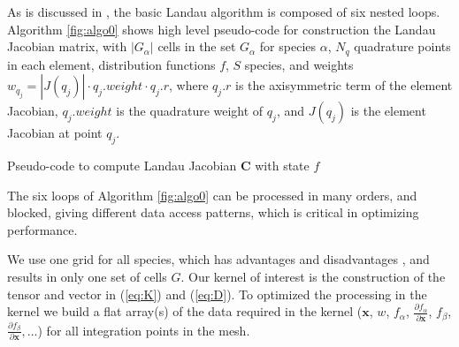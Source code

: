 \documentclass[12pt]{siamart}
\begin{document}
As is discussed in \cite{AdamsHirvijokiKnepleyBrownIsaacMills2017}, the basic Landau algorithm is composed of six nested loops.
Algorithm \ref{fig:algo0} shows high level pseudo-code for construction the
Landau Jacobian matrix, with $|G_\alpha|$ cells in the set $G_\alpha$ for species $\alpha$, $N_q$
quadrature points in each element, distribution functions $f$, $S$
species, and weights $w_{q_j} = |J\left(q_j\right)| \cdot q_j.weight
\cdot q_j.r$, where $q_j.r$ is the axisymmetric term of the element
Jacobian, $q_j.weight$ is the quadrature weight of $q_j$, and
$J\left(q_j\right)$ is the element Jacobian at point $q_j$.
\begin{algorithm}[h!]
\begin{algorithmic}[100]
\ENDFOR
\ENDFOR
\ENDFOR
\ENDFOR
\ENDFOR
\ENDFOR
\end{algorithmic} 
\caption{Pseudo-code to compute Landau Jacobian $\mathbf{C}$ with state $f$}
\label{fig:algo0}
\end{algorithm}
The six loops of Algorithm \ref{fig:algo0} can be processed in many orders, and blocked, giving different data access patterns, which is
critical in optimizing performance.

We use one grid for all species, which has advantages and disadvantages \cite{AdamsHirvijokiKnepleyBrownIsaacMills2017}, and results in only one set of cells $G$.
Our kernel of interest is the construction of the tensor and vector in (\ref{eq:K}) and (\ref{eq:D}).
To optimized the processing in the kernel we build a flat array(s) of the data required in the kernel ($\bm x$, $w$, $f_{\alpha}$,  $\frac{\partial f_{\alpha}}{\partial \bm x}$,  $f_{\beta}$,  $\frac{\partial f_{\beta}}{\partial \bm x}, ... $) for all integration points in the mesh.
\end{document}
